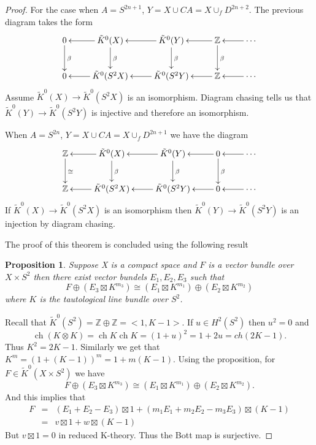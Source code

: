 \documentclass[a4paper,10pt]{article}
\theoremstyle{plain}%
\newtheorem{prop}[thm]{Proposition}
\theoremstyle{definition}
\theoremstyle{remark}
\newcommand{\ZZ}{\mathbb{Z}}
\DeclareMathOperator{\ch}{ch}
\begin{document}
\begin{proof}
For the case when $A=S^{2n+1}$, $Y=X\cup CA = X\cup_{f} D^{2n+2}$. The previous diagram takes the form
\begin{displaymath}
    \xymatrix{
        0 \ar[d]^{\beta} & \tilde{K}^0(X) \ar[l] \ar[d]^{\beta} & \tilde{K}^0(Y) \ar[l] \ar[d]^{\beta} & \ZZ \ar[l] \ar[d]^{\beta} &\ar[l]\cdots\\
        0 & \tilde{K}^0(S^2X) \ar[l]& \tilde{K}^0(S^2 Y) \ar[l] & \ZZ \ar[l] &\ar[l]\cdots
        }
\end{displaymath}
Assume $\tilde{K}^0(X)\to \tilde{K}^0(S^2X)$ is an isomorphism. Diagram chasing tells us that $\tilde{K}^0 (Y)\to \tilde{K}^0(S^2Y)$ is injective and therefore an isomorphism.

When $A=S^{2n}$, $Y=X\cup CA = X\cup_{f} D^{2n+1}$ we have the diagram
\begin{displaymath}
    \xymatrix{
        \ZZ  \ar[d]^{\cong} & \tilde{K}^0(X) \ar[l] \ar[d]^{\beta} & \tilde{K}^0(Y) \ar[l] \ar[d]^{\beta} & 0 \ar[l] \ar[d]^{\beta} &\ar[l]\cdots\\
        \ZZ & \tilde{K}^0(S^2X) \ar[l]& \tilde{K}^0(S^2Y) \ar[l] & 0 \ar[l] &\ar[l]\cdots
        }
\end{displaymath}
If $\tilde{K}^0(X)\to \tilde{K}^0(S^2X)$ is an isomorphism then $\tilde{K}^0(Y)\to \tilde{K}^0(S^2Y)$ is an injection by diagram chasing.

The proof of this theorem is concluded using the following result
\begin{prop}
Suppose X is a compact space and $F$ is a vector bundle over $X\times S^2$ then there exist vector bundels $E_1, E_2, E_3$ such that
\[
F\oplus(E_3\boxtimes K^{m_3})\cong (E_1\boxtimes K^{m_1})\oplus(E_2\boxtimes K^{m_2})
\] where $K$ is the tautological line bundle over $S^2$.
\end{prop}
Recall that $\tilde{K}^0(S^2) =\ZZ\oplus\ZZ= <1,K-1>$.
If $u\in H^2(S^2)$ then $u^2 = 0$ and
\[
\ch(K\otimes K) = \ch K\ch K = (1+u)^2= 1+2u = ch(2K-1).
\] Thus $K^2 = 2K -1$. Similarly we get that $K^m =(1+(K-1))^m = 1+m(K-1).$
Using the proposition, for $F\in \tilde{K}^0(X\times S^2)$ we have \[
F\oplus(E_3\boxtimes K^{m_3})\cong (E_1\boxtimes K^{m_1})\oplus(E_2\boxtimes K^{m_2}).
\] And this implies that
\[\begin{array}{rcl}
F&=&(E_1+E_2-E_3)\boxtimes 1 + (m_1E_1+m_2E_2-m_3E_3)\boxtimes(K-1)\\
 &=& v\boxtimes 1+ w\boxtimes (K-1)
\end{array}
\]
But $v\boxtimes 1 = 0$ in reduced K-theory. Thus the Bott map is surjective.
\end{proof}
\end{document}
